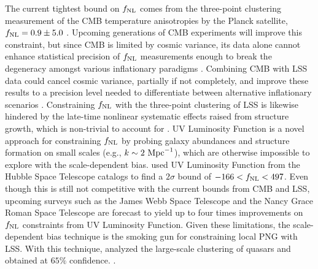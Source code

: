 The current tightest bound on $f_{\rm NL}$ comes from the three-point clustering measurement of the CMB temperature anisotropies by the Planck satellite, $f_{\rm NL}=0.9\pm 5.0$ \citep{akrami2019planck}. Upcoming generations of CMB experiments will improve this constraint, but since CMB is limited by cosmic variance, its data alone cannot enhance statistical precision of $f_{\rm NL}$ measurements enough to break the degeneracy amongst various inflationary paradigms \citep[see, e.g.,][]{ade2019simons}. Combining CMB with LSS data could cancel cosmic variance, partially if not completely, and improve these results to a precision level needed to differentiate between alternative inflationary scenarios \citep[see, e.g.,][]{schmittfull2018PhRvD}. Constraining $f_{\rm NL}$ with the three-point clustering of LSS is likewise hindered by the late-time nonlinear systematic effects raised from structure growth, which is non-trivial to account for \citep{baldauf2011galaxy, baldauf2011primordial}. UV Luminosity Function is a novel approach for constraining $f_{\rm NL}$ by probing galaxy abundances and structure formation on small scales (e.g., $k \sim 2~{\rm Mpc}^{-1}$), which are otherwise impossible to explore with the scale-dependent bias. \cite{sabti2021JCAP} used UV Luminosity Function from the Hubble Space Telescope catalogs \citep{bouwens2015ApJ} to find a $2\sigma$ bound of $-166<f_{\rm NL}<497$. Even though this is still not competitive with the current bounds from CMB and LSS, upcoming surveys such as the James Webb Space Telescope and the Nancy Grace Roman Space Telescope are forecast to yield up to four times improvements on $
f_{\rm NL}$ constraints from UV Luminosity Function. Given these limitations, the scale-dependent bias technique is the smoking gun for constraining local PNG with LSS. With this technique, \cite{mueller2022primordial} analyzed the large-scale clustering of quasars and obtained  at $65\%$ confidence. .

